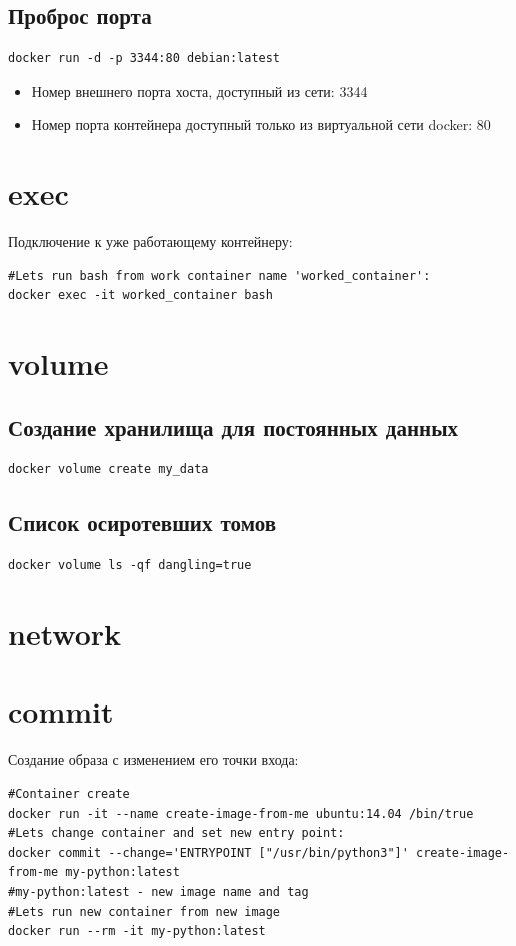 \subsection{Проброс порта}
\begin{lstlisting}
docker run -d -p 3344:80 debian:latest
\end{lstlisting}
\begin{itemize}
\item Номер внешнего порта хоста, доступный из сети: 3344
\item Номер порта контейнера доступный только из виртуальной сети docker: 80
\end{itemize}

\section{exec}
Подключение к уже работающему контейнеру:
\begin{lstlisting}
#Lets run bash from work container name 'worked_container':
docker exec -it worked_container bash
\end{lstlisting}

\section{volume}
\subsection{Создание хранилища для постоянных данных}
\begin{lstlisting}
docker volume create my_data
\end{lstlisting}

\subsection{Список осиротевших томов}
\begin{lstlisting}
docker volume ls -qf dangling=true
\end{lstlisting}


\section{network}
\section{commit}
Создание образа с изменением его точки входа:
\begin{lstlisting}
#Container create
docker run -it --name create-image-from-me ubuntu:14.04 /bin/true
#Lets change container and set new entry point:
docker commit --change='ENTRYPOINT ["/usr/bin/python3"]' create-image-from-me my-python:latest
#my-python:latest - new image name and tag
#Lets run new container from new image
docker run --rm -it my-python:latest
\end{lstlisting}



